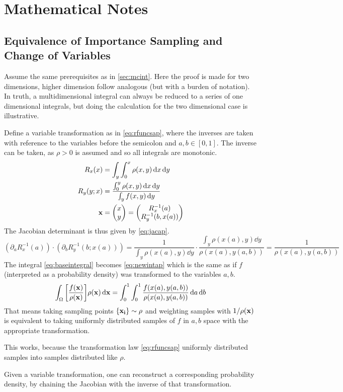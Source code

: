 \section{Mathematical Notes}%
\label{sec:matap}

\subsection{Equivalence of Importance Sampling and Change of
  Variables}%
\label{sec:equap}

Assume the same prerequisites as in \cref{sec:mcint}. Here the proof
is made for two dimensions, higher dimension follow analogous (but
with a burden of notation). In truth, a multidimensional integral can
always be reduced to a series of one dimensional integrals, but doing
the calculation for the two dimensional case is illustrative.

Define a variable transformation as in \cref{eq:rfuncsap}, where the
inverses are taken with reference to the variables before the
semicolon and \(a,b\in [0, 1]\). The inverse can be taken, as
\(\rho > 0\) is assumed and so all integrals are monotonic.
%
\begin{equation}
  \label{eq:rfuncsap}
  \begin{split}
  R_x(x) &= \int_y\int_0^x\rho(x, y) \dd{x}\dd{y} \\
  R_y(y; x) &= \frac{\int_0^y\rho(x, y) \dd{x}\dd{y}}{\int_y
              f(x,y)\dd{y}} \\
  \vb{x} &= \mqty(x \\ y) = \mqty(R_x^{-1}(a) \\ R_y^{-1}(b, x(a)))
  \end{split}
\end{equation}
%
The Jacobian determinant is thus given by \cref{eq:jacap}.
\begin{equation}
  \label{eq:jacap}
  (\partial_a R_x^{-1}(a))\cdot (\partial_b R_y^{-1}(b; x(a))) =
  \frac{1}{\int_y\rho(x(a), y)\dd{y}}\cdot \frac{\int_y\rho(x(a),
    y)\dd{y}}{\rho(x(a), y(a, b))} = \frac{1}{\rho(x(a), y(a, b))}
\end{equation}
%
The integral \cref{eq:baseintegral} becomes \cref{eq:newintap} which
is the same as if \(f\) (interpreted as a probability density) was
transformed to the variables \(a, b\).
%
\begin{equation}
  \label{eq:newintap}
  \int_\Omega
  \qty[\frac{f(\vb{x})}{\rho(\vb{x})}] \rho(\vb{x}) \dd{\vb{x}} =
  \int_0^1\int_0^1 \frac{f(x(a), y(a,b))}{\rho(x(a), y(a, b))} \dd{a}\dd{b}
\end{equation}
%
That means taking sampling points \(\{\vb{x_i}\}\sim \rho\) and
weighting samples with \(1/\rho(\vb{x})\) is equivalent to taking
uniformly distributed samples of \(f\) in \(a,b\) space with the
appropriate transformation.

This works, because the transformation law \cref{eq:rfuncsap}
uniformly distributed samples into samples distributed like \(\rho\).

Given a variable transformation, one can reconstruct a corresponding
probability density, by chaining the Jacobian with the inverse of that
transformation.

